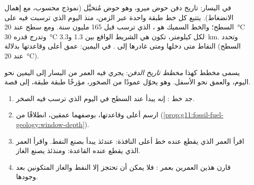 \begin{omfigure}
{\small في اليسار: تاريخ دفن حوض ميرو، وهو حوض مُتخيَّل (نموذج
محسوب، مع إهمال الانضغاط). يتتبع كل خط طبقة واحدة عبر الزمن، منذ
اليوم الذي ترسبت فيه على السطح؛ والخط السميك هو ،
الذي ترسب قبل 165 مليون سنة. ومع سطح عند
\qty{20}{\degreeCelsius} وتدرج قدره \qty{30}{\degreeCelsius} لكل
كيلومتر، تكون  هي الشريط الواقع بين \num{1.3}
و\qty{3.3}{km}. وتحدد النقاط متى دخلها  ومتى
غادرها إلى . في اليمين: عمق أعلى  وقاعدتها
بدلالة  (السطح عند
\qty{20}{\degreeCelsius}).}
\end{omfigure}

يسمى مخطط كهذا \emph{مخطط تاريخ الدفن}: يجري فيه العمر من
اليسار إلى اليمين نحو اليوم، والعمق نحو الأسفل. وهو يحوّل عمودًا من الصخور،
مؤرخًا طبقة طبقة، إلى قصة.

\begin{method}\label{met:g11:fossil-fuel-geology:burial}
\begin{enumerate}
  \item جد خط : إنه يبدأ عند السطح في
        اليوم الذي ترسب فيه الصخر.
  \item ارسم أعلى  وقاعدتها، بوصفهما عمقين، انطلاقًا من
         (\cref{prop:g11:fossil-fuel-geology:window-depth}).
  \item اقرأ العمر الذي يقطع عنده خط  أعلى
        النافذة: عندئذ يبدأ  بصنع النفط. واقرأ العمر الذي
        يقطع عنده القاعدة: ومنذئذ يصنع الغاز.
  \item قارن هذين العمرين بعمر : فلا يمكن أن تحتجز  إلا النفط والغاز
        المتكونين بعد وجودها.
\end{enumerate}
\end{method}

